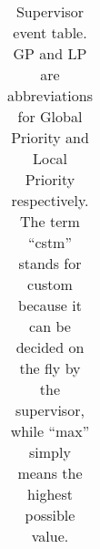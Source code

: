 \begin{table}[hbt!]
\begin{center}
\begin{tabular}{|c|l|l|l|l|r|r|}
    \end{tabular}

    \caption[Supervisor event table]{Supervisor event table. GP and LP are abbreviations for Global Priority and Local Priority respectively. The term ``cstm'' stands for custom because it can be decided on the fly by the supervisor, while ``max'' simply means the highest possible value.}

    \end{center}

\end{table}